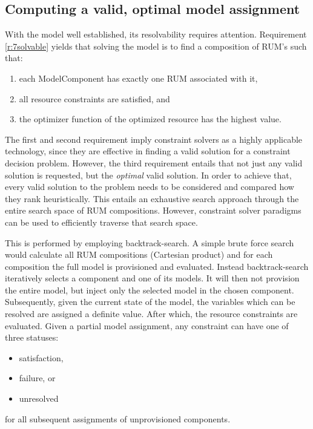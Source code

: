 \subsection{Computing a valid, optimal model assignment}
With the model well established, its resolvability requires attention. Requirement \ref{r:7solvable} yields that solving the model is to find a composition of RUM's such that:
\begin{enumerate}
\nospace
\item each ModelComponent has exactly one RUM associated with it,
\item all resource constraints are satisfied, and
\item the optimizer function of the optimized resource has the highest value.
\end{enumerate}
The first and second requirement imply constraint solvers as a highly applicable technology, since they are effective in finding a valid solution for a constraint decision problem. However, the third requirement entails that not just any valid solution is requested, but the \emph{optimal} valid solution. In order to achieve that, every valid solution to the problem needs to be considered and compared how they rank heuristically. This entails an exhaustive search approach through the entire search space of RUM compositions. However, constraint solver paradigms can be used to efficiently traverse that search space.

This is performed by employing backtrack-search. A simple brute force search would calculate all RUM compositions (Cartesian product) and for each composition the full model is provisioned and evaluated. Instead backtrack-search iteratively selects a component and one of its models. It will then not provision the entire model, but inject only the selected model in the chosen component. Subsequently, given the current state of the model, the variables which can be resolved are assigned a definite value. After which, the resource constraints are evaluated. Given a partial model assignment, any constraint can have one of three statuses:
\begin{itemize}
\nospace
\item satisfaction,
\item failure, or
\item unresolved
\end{itemize}
for all subsequent assignments of unprovisioned components.

